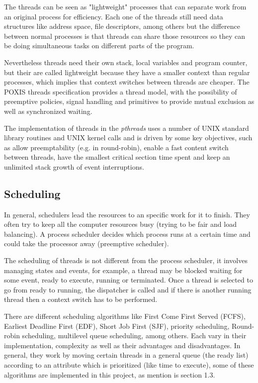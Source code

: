 \documentclass[a4paper,9pt]{article}
\begin{document}
The threads can be seen as "lightweight" processes that can separate work from an original process for efficiency. Each one of the threads still need data structures like address space, file descriptors, among others but the difference between normal processes is that threads can share those resources so they can be doing simultaneous tasks on different parts of the program. \cite{butenhof1997programming}  

Nevertheless threads need their own stack, local variables and program counter, but their are called lightweight because they have a smaller context than regular processes, which implies that context switches between threads are cheaper. The POXIS threads specification provides a 
thread model, with the possibility of preemptive policies, signal handling and primitives to provide mutual exclusion as well as synchronized waiting. \cite{mueller1993library} 

The implementation of threads in the \emph{pthreads} uses a number of UNIX standard library routines and UNIX kernel calls and is driven by some key objectives, such as allow preemptability (e.g. in round-robin), enable a fast content switch between threads, have the smallest critical section time spent and keep an unlimited stack growth of event interruptions. \cite{mueller1993library}

\subsection{Scheduling}

In general, schedulers lead the resources to an specific work for it to finish. They often try to keep all the computer resources busy (trying to be fair and load balancing). A process scheduler decides which process runs at a certain time and could take the processor away (preemptive scheduler). \cite{wikiSch}

The scheduling of threads is not different from the process scheduler, it involves managing states and events, for example, a thread may be blocked waiting for some event, ready to execute, running or terminated. Once a thread is selected to go from ready to running, the dispatcher is called and if there is another running thread then a context switch has to be performed. \cite{mueller1993library}

There are different scheduling algorithms like First Come First Served (FCFS), Earliest Deadline First (EDF), Short Job First (SJF), priority scheduling, Round-robin scheduling, multilevel queue scheduling, among others. Each vary in their implementation, complexity as well as their advantages and disadvantages. In general, they work by moving certain threads in a general queue (the ready list) according to an attribute which is prioritized (like time to execute), some of these algorithms are implemented in this project, as mention is section 1.3.
\end{document}
